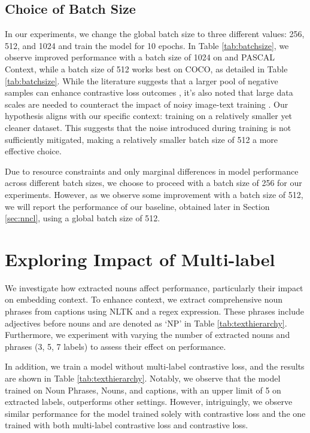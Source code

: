 \subsection{Choice of Batch Size}
In our experiments, we change the global batch size to three different values: 256, 512, and 1024 and train the model for 10 epochs. In Table \ref{tab:batchsize}, we observe improved performance with a batch size of 1024 on \pvoc and PASCAL Context, while a batch size of 512 works best on COCO, as detailed in Table \ref{tab:batchsize}. While the literature suggests that a larger pool of negative samples can enhance contrastive loss outcomes \cite{jia2021scaling}\cite{radford2021learning}, it's also noted that large data scales are needed to counteract the impact of noisy image-text training \cite{jia2021scaling}. Our hypothesis aligns with our specific context: training on a relatively smaller yet cleaner dataset. This suggests that the noise introduced during training is not sufficiently mitigated, making a relatively smaller batch size of 512 a more effective choice. 

Due to resource constraints and only marginal differences in model performance across different batch sizes, we choose to proceed with a batch size of 256 for our experiments. However, as we observe some improvement with a batch size of 512, we will report the performance of our baseline, obtained later in Section \ref{sec:nncl}, using a global batch size of 512.


\section{Exploring Impact of Multi-label}
\label{sec:explabel}
We investigate how extracted nouns affect performance, particularly their impact on embedding context. To enhance context, we extract comprehensive noun phrases from captions using NLTK and a regex expression. These phrases include adjectives before nouns and are denoted as `NP' in Table \ref{tab:texthierarchy}. Furthermore, we experiment with varying the number of extracted nouns and phrases (3, 5, 7 labels) to assess their effect on performance.

In addition, we train a model without multi-label contrastive loss, and the results are shown in Table \ref{tab:texthierarchy}. Notably, we observe that the model trained on Noun Phrases, Nouns, and captions, with an upper limit of 5 on extracted labels, outperforms other settings. However, intriguingly, we observe similar performance for the model trained solely with contrastive loss and the one trained with both multi-label contrastive loss and contrastive loss.

